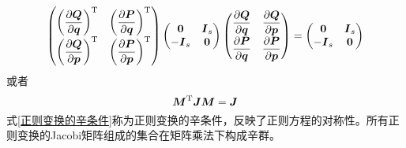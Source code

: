 \begin{equation*}
	\begin{pmatrix} \left(\dfrac{\partial \boldsymbol{Q}}{\partial \boldsymbol{q}}\right)^{\mathrm{T}} & \left(\dfrac{\partial \boldsymbol{P}}{\partial \boldsymbol{q}}\right)^{\mathrm{T}} \\[1.5ex] \left(\dfrac{\partial \boldsymbol{Q}}{\partial \boldsymbol{p}}\right)^{\mathrm{T}} & \left(\dfrac{\partial \boldsymbol{P}}{\partial \boldsymbol{p}}\right)^{\mathrm{T}} \end{pmatrix} \begin{pmatrix} \boldsymbol{0} & \boldsymbol{I}_s \\ -\boldsymbol{I}_s & \boldsymbol{0} \end{pmatrix} \begin{pmatrix} \dfrac{\partial \boldsymbol{Q}}{\partial \boldsymbol{q}} & \dfrac{\partial \boldsymbol{Q}}{\partial \boldsymbol{p}} \\[1.5ex] \dfrac{\partial \boldsymbol{P}}{\partial \boldsymbol{q}} & \dfrac{\partial \boldsymbol{P}}{\partial \boldsymbol{p}} \end{pmatrix} = \begin{pmatrix} \boldsymbol{0} & \boldsymbol{I}_s \\ -\boldsymbol{I}_s & \boldsymbol{0} \end{pmatrix}
\end{equation*}
或者
\begin{equation}
	\boldsymbol{M}^{\mathrm{T}} \boldsymbol{J} \boldsymbol{M} = \boldsymbol{J}
	\label{正则变换的辛条件}
\end{equation}
式\eqref{正则变换的辛条件}称为{\heiti 正则变换的辛条件}，反映了正则方程的对称性。所有正则变换的Jacobi矩阵组成的集合在矩阵乘法下构成{\heiti 辛群}。

